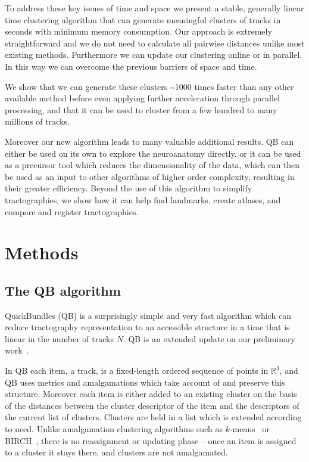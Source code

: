 \documentclass[journal]{IEEEtran}
\begin{document}
To address these key issues of time and space we present a stable,
generally linear time clustering algorithm that can generate meaningful
clusters of tracks in seconds with minimum memory consumption. Our
approach is extremely straightforward and we do not need to calculate
all pairwise distances unlike most existing
methods. Furthermore we can update our clustering online or in
parallel. In this way we can overcome the previous barriers of space and
time.

We show that we can generate these clusters \textasciitilde1000 times faster than
any other available method before even applying further
acceleration through parallel processing, and that it can be used to
cluster from a few hundred to many millions of tracks.

Moreover our new algorithm leads to many valuable additional results. QB
can either be used on its own to explore the neuroanatomy directly, or
it can be used as a precursor tool which reduces the dimensionality of
the data, which can then be used as an input to other algorithms of
higher order complexity, resulting in their greater efficiency. Beyond
the use of this algorithm to simplify tractographies, we show how it can
help find landmarks, create atlases, and compare and register
tractographies.

\section{Methods}

\subsection{The QB algorithm\label{sub:QB-description}}

QuickBundles (QB) is a surprisingly simple and very fast algorithm which
can reduce tractography representation to an accessible structure in a
time that is linear in the number of tracks $N$. QB is an extended
update on our preliminary work~\cite{EGMB10}.

In QB each item, a track, is a fixed-length ordered sequence of points
in $\mathbb{R}^{3}$, and QB uses metrics and amalgamations which take
account of and preserve this structure.  Moreover each item is either
added to an existing cluster on the basis of the distances between the
cluster descriptor of the item and the descriptors of the current list of
clusters. Clusters are held in a list which is extended according to
need. Unlike amalgamation clustering algorithms such as
$k$-means~\cite{steinhaus1956division, macqueen1967some} or
BIRCH~\cite{zhang1997birch}, there is no reassignment or updating phase
-- once an item is assigned to a cluster it stays there, and clusters
are not amalgamated.
\end{document}
